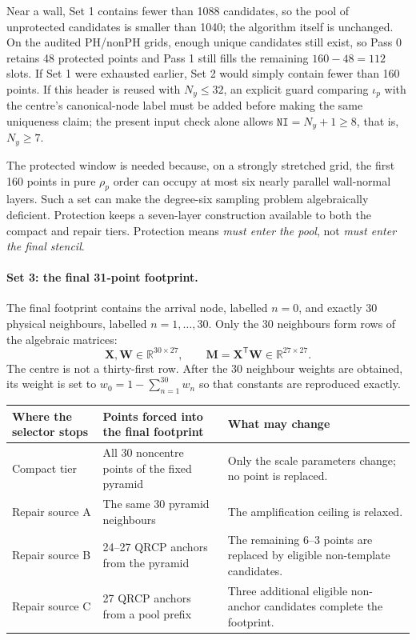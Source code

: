 \documentclass[11pt,a4paper]{article}
\begin{document}
Near a wall, Set 1 contains fewer than 1088 candidates, so the pool of unprotected
candidates is smaller than 1040; the algorithm itself is unchanged. On the audited
PH/nonPH grids, enough unique candidates still exist, so Pass 0 retains 48 protected
points and Pass 1 still fills the remaining $160-48=112$ slots. If Set 1 were exhausted
earlier, Set 2 would simply contain fewer than 160 points. If this header is reused with
$N_y\le32$, an explicit guard comparing $\iota_p$ with the centre's canonical-node label
must be added before making the same uniqueness claim; the present input check alone
allows $\texttt{NI}=N_y+1\ge8$, that is, $N_y\ge7$.

The protected window is needed because, on a strongly stretched grid, the first 160
points in pure $\rho_p$ order can occupy at most six nearly parallel wall-normal layers.
Such a set can make the degree-six sampling problem algebraically deficient. Protection
keeps a seven-layer construction available to both the compact and repair tiers.
Protection means \emph{must enter the pool}, not \emph{must enter the final stencil}.

\paragraph{Set 3: the final 31-point footprint.}
The final footprint contains the arrival node, labelled $n=0$, and exactly 30 physical
neighbours, labelled $n=1,\ldots,30$. Only the 30 neighbours form rows of the algebraic
matrices:
\begin{equation}
 \bm X,\bm W\in\mathbb R^{30\times27},\qquad
 \bm M=\bm X^{\mathsf T}\bm W\in\mathbb R^{27\times27}.
\label{eq:project-shapes}
\end{equation}
The centre is not a thirty-first row. After the 30 neighbour weights are obtained, its
weight is set to $w_0=1-\sum_{n=1}^{30}w_n$ so that constants are reproduced exactly.

\begin{center}\small
\begin{tabularx}{\textwidth}{@{}P{3.0cm}P{5.4cm}X@{}}
\toprule
\textbf{Where the selector stops} & \textbf{Points forced into the final footprint}
& \textbf{What may change} \\
\midrule
Compact tier & All 30 noncentre points of the fixed pyramid & Only the scale parameters
change; no point is replaced. \\
Repair source A & The same 30 pyramid neighbours & The amplification ceiling is relaxed. \\
Repair source B & 24--27 QRCP anchors from the pyramid & The remaining 6--3 points are
replaced by eligible non-template candidates. \\
Repair source C & 27 QRCP anchors from a pool prefix & Three additional eligible
non-anchor candidates complete the footprint. \\
\bottomrule
\end{tabularx}
\end{center}
\end{document}
